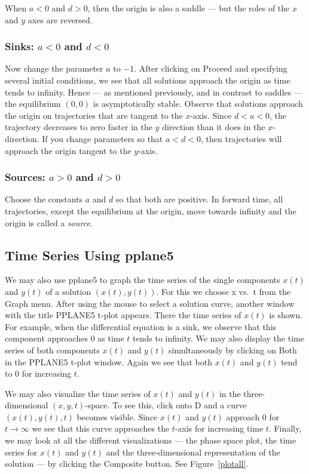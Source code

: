 When $a<0$ and $d>0$, then the origin is also a saddle ---
but the roles of the $x$ and $y$ axes are reversed.

\subsubsection*{Sinks: $a<0$ and $d<0$} 

Now change the parameter $a$ to $-1$. After clicking on {\sf
Proceed} and specifying several initial conditions, we see that
all solutions approach the origin as time tends to infinity.
Hence --- as mentioned previously, and in contrast to saddles ---
the equilibrium $(0,0)$ is asymptotically stable.  Observe that
solutions approach the origin on trajectories that are tangent to
the $x$-axis.  Since $d<a<0$, the trajectory decreases to zero faster
in the $y$ direction than it does in the $x$-direction.  If
you change parameters so that $a<d<0$, then trajectories will
approach the origin tangent to the $y$-axis.

\subsubsection*{Sources: $a>0$ and $d>0$} 

Choose the constants $a$ and $d$ so that both are positive.
In forward time, all trajectories, except the equilibrium at the
origin, move towards infinity and the origin is called a
{\em source\/}.

\subsection*{Time Series Using {\sf pplane5}} 

We may also use {\sf pplane5} to graph the time series of the
single components $x(t)$ and $y(t)$ of a solution $(x(t),y(t))$.
For this we choose {\sf x vs.\ t} from the {\sf Graph} menu.
After using the mouse to select a solution curve, another window
with the title {\sf PPLANE5 t-plot} appears.  There the time
series of $x(t)$ is shown.  For example, when the differential 
equation is a sink, we observe that this component
approaches $0$ as time $t$ tends to infinity.  We may also
display the time series of both components $x(t)$ and $y(t)$
simultaneously by clicking on {\sf Both} in the {\sf PPLANE5 t-plot} 
window.  Again we see that both $x(t)$ and $y(t)$ tend
to $0$ for increasing $t$.

We may also visualize the time series  of
$x(t)$ and $y(t)$ in the three-dimensional $(x,y,t)$-space.  To
see this, click onto { D} and a curve $(x(t),y(t),t)$ 
becomes visible.  Since $x(t)$ and $y(t)$
approach $0$ for $t\to\infty$ we see that this curve
approaches the $t$-axis for increasing time $t$.  Finally, we
may look at all the different visualizations --- the phase space
plot, the time series for $x(t)$ and $y(t)$ and the
three-dimensional representation of the solution --- by clicking
the {\sf Composite} button.  See Figure~\ref{plotall}.


